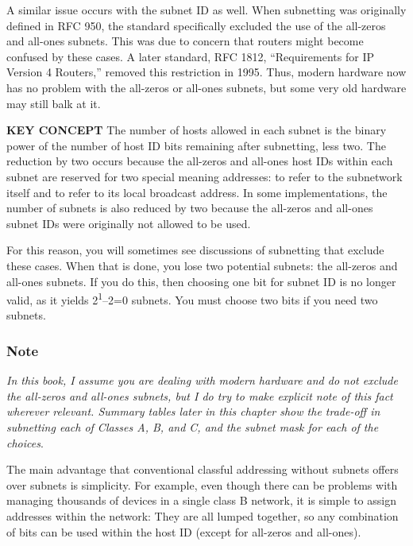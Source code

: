 A similar issue occurs with the subnet ID as well. When subnetting was
originally defined in RFC 950, the standard specifically excluded the
use of the all-zeros and all-ones subnets. This was due to concern that
routers might become confused by these cases. A later standard, RFC
1812, ``Requirements for IP Version 4 Routers,'' removed this restriction
in 1995. Thus, modern hardware now has no problem with the all-zeros or
all-ones subnets, but some very old hardware may still balk at it.


{\textbf{KEY CONCEPT}} The number of hosts allowed in each subnet is the
binary power of the number of host ID bits remaining after subnetting,
less two. The reduction by two occurs because the all-zeros and all-ones
host IDs within each subnet are reserved for two special meaning
addresses: to refer to the subnetwork itself and to refer to its local
broadcast address. In some implementations, the number of subnets is
also reduced by two because the all-zeros and all-ones subnet IDs were
originally not allowed to be used.

For this reason, you will sometimes see discussions of subnetting that
exclude these cases. When that is done, you lose two potential subnets:
the all-zeros and all-ones subnets. If you do this, then choosing one
bit for subnet ID is no longer valid, as it yields
2\textsuperscript{1}--2=0 subnets. You must choose two bits if you need
two subnets.

\subsubsection[Note]{\texorpdfstring{Note}{Note}}

{\emph{In this book, I assume you are dealing with modern hardware and
do not exclude the all-zeros and all-ones subnets, but I do try to make
explicit note of this fact wherever relevant. Summary tables later in
this chapter show the trade-off in subnetting each of Classes A, B, and
C, and the subnet mask for each of the choices}}.



The main
advantage that conventional classful addressing without subnets offers
over subnets is simplicity. For example, even though there can be
problems with managing thousands of devices in a single class B network,
it is simple to assign addresses within the network: They are all lumped
together, so any combination of bits can be used within the host ID
(except for all-zeros and all-ones).

